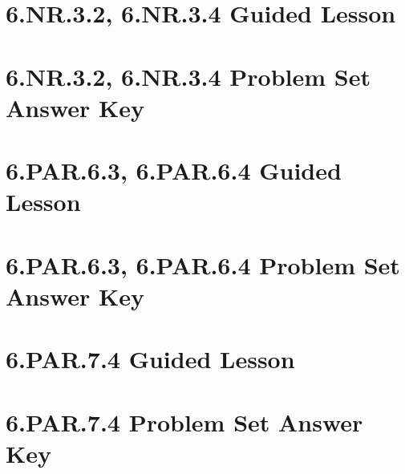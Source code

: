\documentclass[a4paper,12pt]{article}
\begin{document}
\newpage
\section{6.NR.3.2, 6.NR.3.4 Guided Lesson}


\newpage
\section{6.NR.3.2, 6.NR.3.4 Problem Set Answer Key}


\newpage
\section{6.PAR.6.3, 6.PAR.6.4 Guided Lesson}


\newpage
\section{6.PAR.6.3, 6.PAR.6.4 Problem Set Answer Key}


\newpage
\section{6.PAR.7.4 Guided Lesson}


\newpage
\section{6.PAR.7.4 Problem Set Answer Key}

\end{document}

